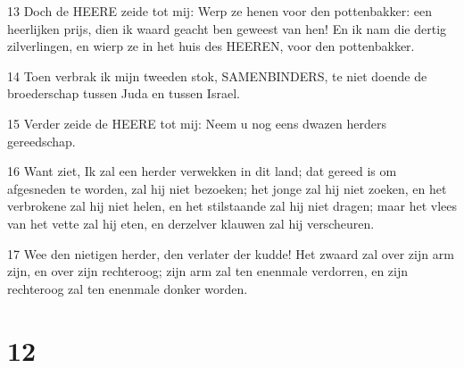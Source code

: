 \par 13 Doch de HEERE zeide tot mij: Werp ze henen voor den pottenbakker: een heerlijken prijs, dien ik waard geacht ben geweest van hen! En ik nam die dertig zilverlingen, en wierp ze in het huis des HEEREN, voor den pottenbakker.
\par 14 Toen verbrak ik mijn tweeden stok, SAMENBINDERS, te niet doende de broederschap tussen Juda en tussen Israel.
\par 15 Verder zeide de HEERE tot mij: Neem u nog eens dwazen herders gereedschap.
\par 16 Want ziet, Ik zal een herder verwekken in dit land; dat gereed is om afgesneden te worden, zal hij niet bezoeken; het jonge zal hij niet zoeken, en het verbrokene zal hij niet helen, en het stilstaande zal hij niet dragen; maar het vlees van het vette zal hij eten, en derzelver klauwen zal hij verscheuren.
\par 17 Wee den nietigen herder, den verlater der kudde! Het zwaard zal over zijn arm zijn, en over zijn rechteroog; zijn arm zal ten enenmale verdorren, en zijn rechteroog zal ten enenmale donker worden.

\chapter{12}

